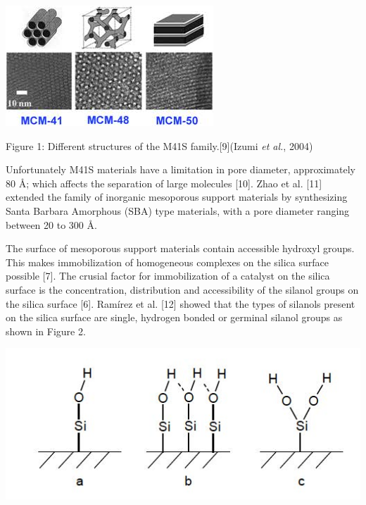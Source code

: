 \documentclass[]{article}
\begin{document}
\begin{center}\includegraphics[width=0.9\linewidth]{Data/Images/Mcm-structures} \end{center}

Figure 1: Different structures of the M41S family.{[}9{]}(Izumi \emph{et
al.}, 2004)

Unfortunately M41S materials have a limitation in pore diameter,
approximately 80 Å; which affects the separation of large molecules
{[}10{]}. Zhao et al. {[}11{]} extended the family of inorganic
mesoporous support materials by synthesizing Santa Barbara Amorphous
(SBA) type materials, with a pore diameter ranging between 20 to 300 Å.

The surface of mesoporous support materials contain accessible hydroxyl
groups. This makes immobilization of homogeneous complexes on the silica
surface possible {[}7{]}. The crusial factor for immobilization of a
catalyst on the silica surface is the concentration, distribution and
accessibility of the silanol groups on the silica surface {[}6{]}.
Ramírez et al. {[}12{]} showed that the types of silanols present on the
silica surface are single, hydrogen bonded or germinal silanol groups as
shown in Figure 2.

\begin{center}\includegraphics[width=0.9\linewidth]{Data/Images/Silanol_groups} \end{center}
\end{document}

